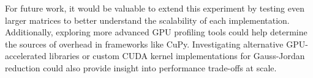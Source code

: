 \documentclass[12pt]{article}
\begin{document}
For future work, it would be valuable to extend this experiment by testing even larger matrices to better understand the scalability of each implementation. Additionally, exploring more advanced GPU profiling tools could help determine the sources of overhead in frameworks like CuPy. Investigating alternative GPU-accelerated libraries or custom CUDA kernel implementations for Gauss-Jordan reduction could also provide insight into performance trade-offs at scale.

\newpage


\end{document}
